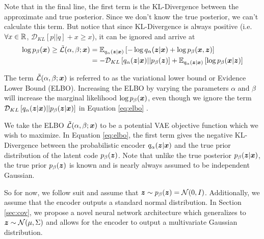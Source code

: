 Note that in the final line, the first term is the KL-Divergence between the approximate and true posterior. Since we don't know the true posterior, we can't calculate this term. But notice that since KL-Divergence is always positive (i.e. $\forall x \in \mathbb{R}$, $\mathcal{D}_{KL}[p||q] + x \geq x$), it can be ignored and arrive at
\begin{equation}
  \begin{split}
    \log p_\beta (\boldsymbol{x}) \geq \tilde{\mathcal{L}}(\alpha, \beta; \boldsymbol{x}) &= \mathbb{E}_{q_\alpha(\boldsymbol{z} | \boldsymbol{x})}\left[ -\log q_\alpha(\boldsymbol{z} | \boldsymbol{x}) + \log p_{\beta}(\boldsymbol{x}, \boldsymbol{z}) \right] \\
    &= -\mathcal{D}_{KL}\left[ q_\alpha(\boldsymbol{z} | \boldsymbol{x}) || p_{\beta}(\boldsymbol{z}) \right] + \mathbb{E}_{q_\alpha(\boldsymbol{z} | \boldsymbol{x})}\left[ \log p_{\beta}(\boldsymbol{x} | \boldsymbol{z}) \right]
  \label{eq:elbo}
\end{split}
\end{equation}

The term $\tilde{\mathcal{L}}(\alpha, \beta; \boldsymbol{x})$ is referred to as the variational lower bound or Evidence Lower Bound (ELBO). Increasing the ELBO by varying the parameters $\alpha$ and $\beta$ will increase the marginal likelihood $\log p_\beta(\boldsymbol{x})$, even though we ignore the term $\mathcal{D}_{KL}\left[ q_\alpha (\boldsymbol{z} | \boldsymbol{x}) || p_\beta(\boldsymbol{z} | \boldsymbol{x}) \right]$ in Equation \ref{eq:elbo} \cite{zhao2017}.

We take the ELBO $\tilde{\mathcal{L}}(\alpha,\beta; \boldsymbol{x})$ to be a potential VAE objective function which we wish to maximize. In Equation \ref{eq:elbo}, the first term gives the negative KL-Divergence between the probabilistic encoder $q_\alpha(\boldsymbol{z} | \boldsymbol{x})$ and the true prior distribution of the latent code $p_\beta(\boldsymbol{z})$. Note that unlike the true posterior $p_\beta(\boldsymbol{z} | \boldsymbol{x})$, the true prior $p_\beta(\boldsymbol{z})$ is known and is nearly always assumed to be independent Gaussian. 

So for now, we follow suit and assume that $\boldsymbol{z} \sim p_\beta(\boldsymbol{z}) = \mathcal{N}(0,I)$. Additionally, we assume that the encoder outputs a standard normal distribution. In Section \ref{sec:cov}, we propose a novel neural network architecture which generalizes to $\boldsymbol{z} \sim \mathcal{N}(\mu, \Sigma)$ and allows for the encoder to output a multivariate Gaussian distribution.

